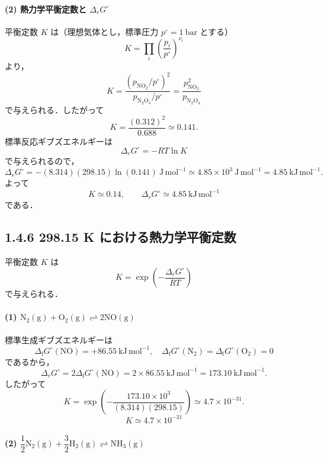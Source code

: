 \documentclass[a4paper,12pt]{jlreq}
\begin{document}
\paragraph{(2) 熱力学平衡定数と \(\Delta_r G^\circ\)}

平衡定数 \(K\) は（理想気体とし，標準圧力 \(p^\circ=1\ \mathrm{bar}\) とする）
\[
 K = \prod_i\left(\frac{p_i}{p^\circ}\right)^{\nu_i}
\]
より，
\[
 K = \frac{\left(p_{\mathrm{NO_2}}/p^\circ\right)^2}
          {p_{\mathrm{N_2O_4}}/p^\circ}
   = \frac{p_{\mathrm{NO_2}}^2}{p_{\mathrm{N_2O_4}}}
\]
で与えられる．したがって
\[
 K = \frac{(0.312)^2}{0.688}
   \simeq 0.141.
\]
標準反応ギブズエネルギーは
\[
 \Delta_r G^\circ = -RT\ln K
\]
で与えられるので，
\[
 \Delta_r G^\circ
 = -(8.314)(298.15)\ln(0.141)\ \mathrm{J\,mol^{-1}}
 \simeq 4.85\times10^3\ \mathrm{J\,mol^{-1}}
 = 4.85\ \mathrm{kJ\,mol^{-1}}.
\]
よって
\[
 \boxed{K \simeq 0.14,\qquad
        \Delta_r G^\circ \simeq 4.85\ \mathrm{kJ\,mol^{-1}}}
\]
である．


\subsection*{1.4.6 298.15 K における熱力学平衡定数}

平衡定数 \(K\) は
\[
 K = \exp\left(-\frac{\Delta_r G^\circ}{RT}\right)
\]
で与えられる．

\paragraph{(1) \(\mathrm{N_2(g)} + \mathrm{O_2(g)} \rightleftharpoons 2\mathrm{NO(g)}\)}

標準生成ギブズエネルギーは
\[
 \Delta_{\mathrm f}G^\circ(\mathrm{NO}) = +86.55\ \mathrm{kJ\,mol^{-1}},
\quad
 \Delta_{\mathrm f}G^\circ(\mathrm{N_2}) = \Delta_{\mathrm f}G^\circ(\mathrm{O_2}) = 0
\]
であるから，
\[
 \Delta_r G^\circ
 = 2\Delta_{\mathrm f}G^\circ(\mathrm{NO})
 = 2\times 86.55\ \mathrm{kJ\,mol^{-1}}
 = 173.10\ \mathrm{kJ\,mol^{-1}}.
\]
したがって
\[
 K
 = \exp\left(-\frac{173.10\times10^3}{(8.314)(298.15)}\right)
 \simeq 4.7\times10^{-31}.
\]
\[
 \boxed{K \simeq 4.7\times10^{-31}}
\]

\paragraph{(2) \(\dfrac12\mathrm{N_2(g)} + \dfrac32\mathrm{H_2(g)} \rightleftharpoons \mathrm{NH_3(g)}\)}
\end{document}
